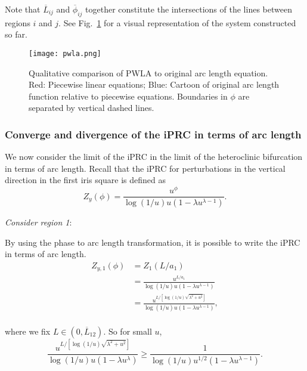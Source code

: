 Note that $\overline L_{ij}$ and $\overline\phi_{ij}$ together constitute the intersections of the lines between regions $i$ and $j$.  See Fig.~\ref{pwla} for a visual representation of the system constructed so far.

\begin{figure}[h!]
\begin{center}
\texttt{[image: pwla.png]}
\caption{Qualitative comparison of PWLA to original arc length equation.  Red: Piecewise linear equations; Blue: Cartoon of original arc length function relative to piecewise equations.  Boundaries in $\phi$ are separated by vertical dashed lines.}\label{pwla}
\end{center}
\end{figure}

\subsubsection{Converge and divergence of the iPRC in terms of arc length}

We now consider the limit of the iPRC in the limit of the heteroclinic bifurcation in terms of arc length.  Recall that the iPRC for perturbations in the vertical direction in the first iris square is defined as
\begin{equation}
 Z_y(\phi) = \frac{u^{\phi}}{\log(1/u) u (1-\lambda u^{\lambda-1})}.
\end{equation}


\textit{Consider region 1}:

By using the phase to arc length transformation, it is possible to write the iPRC in terms of arc length.
\begin{equation}
\begin{split}
 Z_{y,1}(\phi) &= Z_1(L/a_1)\\
 &=\frac{u^{L/a_1}}{\log(1/u) u (1-\lambda u^{\lambda-1})}\\
 &=\frac{u^{L/[\log(1/u)\sqrt{\lambda^2+u^2}]}}{\log(1/u) u (1-\lambda u^{\lambda-1})},\\
 \end{split}
\end{equation}

where we fix $L \in (0,\overline L_{12})$.  So for small $u$,
\begin{equation}
\frac{u^{L/[\log(1/u)\sqrt{\lambda^2+u^2}]}}{\log(1/u) u (1-\lambda u^{\lambda})} \geq \frac{1}{\log(1/u) u^{1/2} (1-\lambda u^{\lambda-1})}.
\end{equation}

